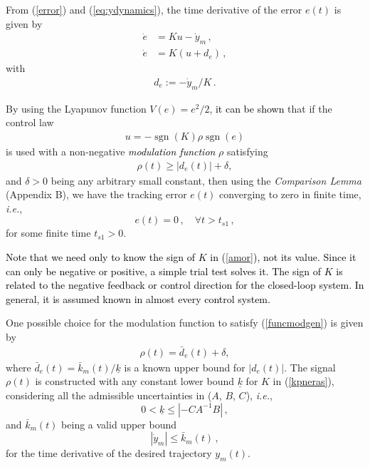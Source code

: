 \documentclass[review]{elsarticle}
\newcommand{\sgn}{\operatorname{sgn}}
\begin{document}
From (\ref{error}) and (\ref{eq:ydynamics}), the time derivative of the error $e(t)$ is given by
%
%
\begin{align}
\dot{e}&=K u- \dot y _m\,, \\
\dot{e}&=K(u+d_e)\,, \label{edoerro}
\end{align}
%
with
%
\begin{align}
d_e:=-\dot y _m/K \,. \label{moduerro}
\end{align}

By using the Lyapunov function $V(e)=e^2/2$, \textcolor{black}{it can be shown} that if the control law
%
%
\begin{align}\label{amor}
    u=-\sgn(K)\rho\sgn(e)
\end{align}
%
is used with a non-negative \textcolor{black}{\textit{modulation function}} $\rho$ satisfying
%
\begin{align}
\rho(t)\geq|d_e(t)|+\delta, \label{funcmodgen}
\end{align}
%
and $\delta\!>\!0$ being any arbitrary small constant, then using the \textit{Comparison Lemma} (Appendix B), we have the
tracking error $e(t)$ converging to zero in finite time, \textit{i.e.},
%
\begin{equation}
e(t)=0\,, \quad \forall t
> t_{s1}\,,
\label{eq:boundMIMOKpconhecido2}
\end{equation}
%
for some finite time $t_{s1}>0$.
%

\textcolor{black}{Note that we need only to know the sign of $K$ in (\ref{amor}), not its value. Since it can only be negative or positive, a simple trial test solves it. The sign of $K$ is related to the negative feedback or control direction for the closed-loop system. In general, it is assumed known in almost every control system.}

One possible choice for the modulation function to satisfy (\ref{funcmodgen}) is given by
%
\begin{align}
\rho(t)=\bar{d}_e(t)+\delta, \label{funcmodgenequal}
\end{align}
%
where $\bar{d}_e(t)=\bar{k}_m(t)/\underline{k}$ is a known upper bound for $|d_e(t)|$. The signal $\rho(t)$ is constructed with any constant lower bound $\underline{k}$ for $K$ in (\ref{kpneras}), considering all the admissible uncertainties in ($A$, $B$, $C$), \textit{i.e.},
%
\begin{equation}
0<\underline{k}\leq|-CA^{-1}B|\,,
\end{equation}
%
and $\bar{k}_m(t)$ being a valid upper bound
%
\begin{equation}
|\dot{y}_m| \leq\bar{k}_m(t)\,,
\end{equation}
%
for the time derivative of the desired trajectory $y_m(t)$.
\end{document}

